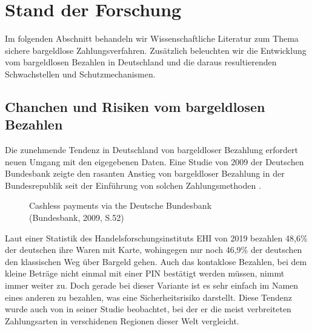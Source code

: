 \section{Stand der Forschung}

Im folgenden Abschnitt behandeln wir Wissenschaftliche Literatur zum Thema sichere bargeldlose
Zahlungsverfahren. Zusätzlich beleuchten wir die Entwicklung vom bargeldlosen Bezahlen in Deutschland 
und die daraus resultierenden Schwachstellen und Schutzmechanismen.


\subsection{Chanchen und Risiken vom bargeldlosen Bezahlen}

Die zunehmende Tendenz in Deutschland von bargeldloser Bezahlung erfordert neuen Umgang mit den 
eigegebenen Daten. Eine Studie von 2009 der Deutschen Bundesbank zeigte den rasanten Anstieg von 
bargeldloser Bezahlung in der Bundesrepublik seit der Einführung von solchen Zahlungsmethoden 
\cite{refrep:DBCP}.

\begin{figure}[htb]
    \caption{Cashless payments via the Deutsche Bundesbank\\ (Bundesbank, 2009, S.52)}
    \label{fig:refrep_DB}
\end{figure}


Laut einer Statistik des Handelsforschungsinstituts EHI von 2019 \cite{refart:KSDL} bezahlen 48,6\% 
der deutschen ihre Waren mit Karte, wohingegen nur noch 46,9\% der deutschen den klassischen 
Weg über Bargeld gehen. Auch das kontaklose Bezahlen, bei dem kleine Beträge nicht einmal mit einer 
PIN bestätigt werden müssen, nimmt immer weiter zu. Doch gerade bei dieser Variante ist es sehr einfach
im Namen eines anderen zu bezahlen, was eine Sicherheitsrisiko darstellt. Diese Tendenz wurde auch
von \cite{refart:TDMP} in seiner Studie beobachtet, bei der er die meist verbreiteten Zahlungsarten
in verschidenen Regionen dieser Welt vergleicht. 



